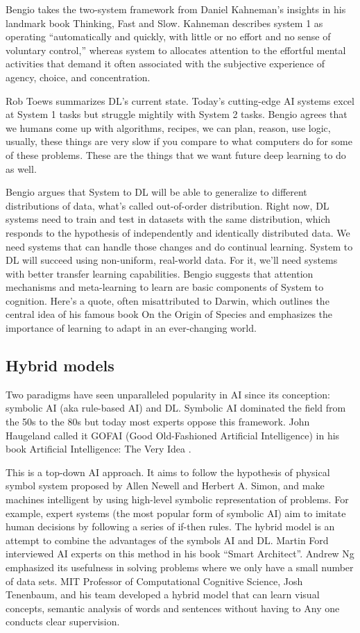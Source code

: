\documentclass{article}
\begin{document}
Bengio takes the two-system framework from Daniel Kahneman’s insights in his landmark book Thinking, Fast and Slow. Kahneman describes system 1 as operating ``automatically and quickly, with little or no effort and no sense of voluntary control,'' whereas system to allocates attention to the effortful mental activities that demand it often associated with the subjective experience of agency, choice, and concentration.

Rob Toews summarizes DL’s current state. Today’s cutting-edge AI systems excel at System 1 tasks but struggle mightily with System 2 tasks.
Bengio agrees that we humans come up with algorithms, recipes, we can plan, reason, use logic, usually, these things are very slow if you compare to what computers do for some of these problems. These are the things that we want future deep learning to do as well.

Bengio argues that System to DL will be able to generalize to different distributions of data, what’s called out-of-order distribution. Right now, DL systems need to train and test in datasets with the same distribution, which responds to the hypothesis of independently and identically distributed data. We need systems that can handle those changes and do continual learning. System to DL will succeed using non-uniform, real-world data.
For it, we’ll need systems with better transfer learning \cite{36} capabilities. Bengio suggests that attention mechanisms and meta-learning to learn are basic components of System to cognition. Here’s a quote, often misattributed to Darwin, which outlines the central idea of his famous book On the Origin of Species and emphasizes the importance of learning to adapt in an ever-changing world.

\subsection{Hybrid models}
Two paradigms have seen unparalleled popularity in AI since its conception: symbolic AI (aka rule-based AI) and DL. Symbolic AI dominated the field from the 50s to the 80s but today most experts oppose this framework. John Haugeland called it GOFAI (Good Old-Fashioned Artificial Intelligence) in his book Artificial Intelligence: The Very Idea \cite{38}.

This is a top-down AI approach. It aims to follow the hypothesis of physical symbol system proposed by Allen Newell and Herbert A. Simon, and make machines intelligent by using high-level symbolic representation of problems. For example, expert systems (the most popular form of symbolic AI) aim to imitate human decisions by following a series of if-then rules.
The hybrid model is an attempt to combine the advantages of the symbols AI and DL. Martin Ford interviewed AI experts on this method in his book ``Smart Architect''. Andrew Ng emphasized its usefulness in solving problems where we only have a small number of data sets. MIT Professor of Computational Cognitive Science, Josh Tenenbaum, and his team developed a hybrid model that can learn visual concepts, semantic analysis of words and sentences without having to Any one conducts clear supervision.
\end{document}

